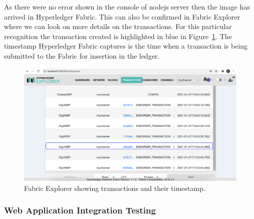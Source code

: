 As there were no error shown in the console of nodejs server then the image has arrived in Hyperledger Fabric. This can also be confirmed in Fabric Explorer where we can look on more details on the transactions. For this particular recognition the transaction created is highlighted in blue in Figure~\ref{fig:fabric_transactions}. The timestamp Hyperledger Fabric captures is the time when a transaction is being submitted to the Fabric for insertion in the ledger. 

\begin{figure}[!htb]
    \centering
    \includegraphics[width=1\textwidth]{figures/explorer_transaction2.png}
    \caption{Fabric Explorer showing transactions and their timestamp.}
    \label{fig:fabric_transactions}
\end{figure}


\subsubsection{Web Application Integration Testing}

